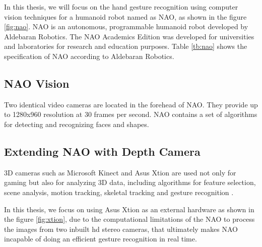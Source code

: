 In this thesis, we will focus on the hand gesture recognition using computer vision techniques for a humanoid robot named as NAO, as shown in the figure \ref{fig:nao}. NAO is an autonomous, programmable humanoid robot developed by Aldebaran Robotics. The NAO Academics Edition was developed for universities and laboratories for research and education purposes. Table \ref{tb:nao} shows the specification of NAO according to Aldebaran Robotics.

\subsection{NAO Vision} Two identical video cameras are located in the forehead of NAO. They provide up to 1280x960 resolution at 30 frames per second. NAO contains a set of algorithms for detecting and recognizing faces and shapes.

\subsection{Extending NAO with Depth Camera} 
3D cameras such as Microsoft Kinect and Asus Xtion are used not only for gaming but also for analyzing 3D data, including algorithms for feature selection, scene analysis, motion tracking, skeletal tracking and gesture recognition \cite{12}. 

In this thesis, we focus on using Asus Xtion as an external hardware as shown in the figure \ref{fig:xtion}, due to the computational limitations of the NAO to process the images from two inbuilt hd stereo cameras, that ultimately makes NAO incapable of doing an efficient gesture recognition in real time.

